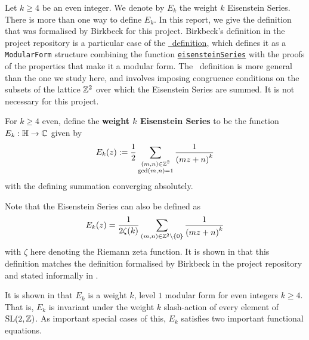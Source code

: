 Let $k \geq 4$ be an even integer. We denote by $E_k$ the weight $k$ Eisenstein Series. There is more than one way to define $E_k$. In this report, we give the definition that was formalised by Birkbeck for this project. Birkbeck's definition in the project repository is a particular case of the \href{https://github.com/leanprover-community/mathlib4/blob/70816aec3a0f7bb98ac42991652a66b6405e1a00/Mathlib/NumberTheory/ModularForms/EisensteinSeries/Basic.lean#L28-L35}{\mathlib\ definition}, which defines it as a \texttt{ModularForm} structure combining the function \href{https://github.com/leanprover-community/mathlib4/blob/70816aec3a0f7bb98ac42991652a66b6405e1a00/Mathlib/NumberTheory/ModularForms/EisensteinSeries/Defs.lean#L107}{\texttt{eisensteinSeries}} with the proofs of the properties that make it a modular form. The \mathlib\ definition is more general than the one we study here, and involves imposing congruence conditions on the subsets of the lattice $\mathbb{Z}^2$ over which the Eisenstein Series are summed. It is not necessary for this project.

\begin{boxdefinition}\label{Ch2:Def:EisensteinSeries_geq_4}
    For $k \geq 4$ even, define the \textbf{weight $k$ Eisenstein Series} to be the function $E_k : \mathbb{H} \to \mathbb{C}$ given by
    \begin{align}
        E_k(z) := \frac{1}{2} \sum_{\substack{\left( m, n \right) \in \mathbb{Z}^2 \\ \gcd(m, n) = 1}} \frac{1}{\left( mz + n \right)^k}
        \label{Ch2:Eq:Eisenstein_def_Chris}
    \end{align}
    with the defining summation converging absolutely.
\end{boxdefinition}

Note that the Eisenstein Series can also be defined as
\begin{align}
    E_k(z) = \frac{1}{2\zeta(k)} \sum_{\left( m, n \right) \in \mathbb{Z}^2 \setminus \left\{ 0 \right\}} \frac{1}{\left( mz + n \right)^k}
    \label{Ch2:Eq:Eisenstein_def_with_zeta_normalisation}
\end{align}
with $\zeta$ here denoting the Riemann zeta function. It is shown in \cite[Equation (4.1), pp. 109-110]{DiamondShurman} that this definition matches the definition formalised by Birkbeck in the project repository and stated informally in .

It is shown in \cite[pp. 4-5]{DiamondShurman} that $E_k$ is a weight $k$, level $1$ modular form for even integers $k \geq 4$. That is, $E_k$ is invariant under the weight $k$ slash-action of every element of $\operatorname{SL}\!\left( 2, \mathbb{Z} \right)$. As important special cases of this, $E_k$ satisfies two important functional equations.

